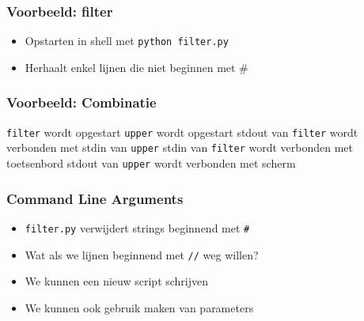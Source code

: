 \begin{frame}
  \frametitle{Voorbeeld: filter}
  \begin{itemize}
    \item Opstarten in shell met \texttt{python filter.py}
    \item Herhaalt enkel lijnen die niet beginnen met \#
  \end{itemize}
\end{frame}

\begin{frame}
  \frametitle{Voorbeeld: Combinatie}
  \begin{center}
  \end{center}
  \begin{overprint}
     \centering
    \texttt{filter} wordt opgestart
     \centering
    \texttt{upper} wordt opgestart
     \centering
    stdout van \texttt{filter} wordt verbonden met stdin van \texttt{upper}
     \centering
    stdin van \texttt{filter} wordt verbonden met toetsenbord
     \centering
    stdout van \texttt{upper} wordt verbonden met scherm
  \end{overprint}
\end{frame}

\begin{frame}
  \frametitle{Command Line Arguments}
  \begin{itemize}
    \item \texttt{filter.py} verwijdert strings beginnend met \texttt{\#}
    \item Wat als we lijnen beginnend met \texttt{//} weg willen?
    \item We kunnen een nieuw script schrijven
    \item We kunnen ook gebruik maken van parameters
  \end{itemize}
\end{frame}

